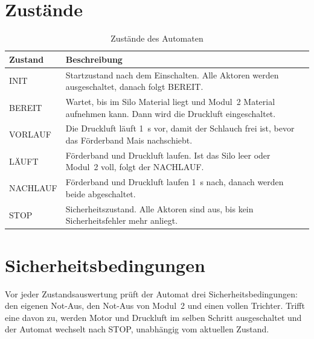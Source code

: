 \section{Zustände}

\begin{table}[htbp]
  \centering
  \begin{tabularx}{\textwidth}{@{}l X@{}}
    \toprule
    \textbf{Zustand} & \textbf{Beschreibung} \\
    \midrule
    INIT     & Startzustand nach dem Einschalten. Alle Aktoren werden ausgeschaltet, danach folgt BEREIT. \\
    BEREIT   & Wartet, bis im Silo Material liegt und Modul~2 Material aufnehmen kann. Dann wird die Druckluft eingeschaltet. \\
    VORLAUF  & Die Druckluft läuft 1~s vor, damit der Schlauch frei ist, bevor das Förderband Mais nachschiebt. \\
    LÄUFT    & Förderband und Druckluft laufen. Ist das Silo leer oder Modul~2 voll, folgt der NACHLAUF. \\
    NACHLAUF & Förderband und Druckluft laufen 1~s nach, danach werden beide abgeschaltet. \\
    STOP     & Sicherheitszustand. Alle Aktoren sind aus, bis kein Sicherheitsfehler mehr anliegt. \\
    \bottomrule
  \end{tabularx}
  \caption{Zustände des Automaten}
  \label{tab:zustaende}
\end{table}

\section{Sicherheitsbedingungen}

Vor jeder Zustandsauswertung prüft der Automat drei Sicherheitsbedingungen:
den eigenen Not-Aus, den Not-Aus von Modul~2 und einen vollen Trichter. Trifft
eine davon zu, werden Motor und Druckluft im selben Schritt ausgeschaltet und
der Automat wechselt nach STOP, unabhängig vom aktuellen Zustand.


